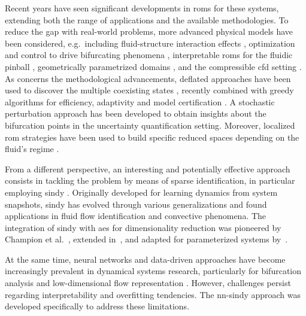 \documentclass[reqno]{amsart}[standalone]
\theoremstyle{definition}
\theoremstyle{remark}
\begin{document}
%

Recent years have seen significant developments in \glspl{rom} for these systems, extending both the range of applications and the available methodologies. To reduce the gap with real-world problems, more advanced physical models have been considered, e.g.\ including fluid-structure interaction effects \parencite{Khamlich_2022}, optimization and control to drive bifurcating phenomena \parencite{PichiDrivingBifurcatingParametrized2022a,Boull2023}, interpretable \glspl{rom} for the fluidic pinball \parencite{Pastur_2019}, geometrically parametrized domains \cite{PICHI2023105813,Bravo_2024}, and the compressible \gls{cfd} setting \parencite{Tonicello_2024}. As concerns the methodological advancements,  deflated approaches have been used to discover the multiple coexisting states \parencite{pintore_2021}, recently combined with greedy algorithms for efficiency, adaptivity and model certification \parencite{pichi2025deflationbasedcertifiedgreedyalgorithm}. A stochastic perturbation approach \parencite{gonnella2025stochasticperturbationapproachnonlinear} has been developed to obtain insights about the bifurcation points in the uncertainty quantification setting. Moreover, localized \gls{rom} strategies have been used to build specific reduced spaces depending on the fluid's regime \parencite{Hess_2019}.

%

From a different perspective, an interesting and potentially effective approach consists in tackling the problem by means of sparse identification, in particular employing \gls{sindy} \parencite{Brunton_2016}. Originally developed for learning dynamics from system snapshots, \gls{sindy} has evolved through various generalizations \parencite{SINDy_ensemble, SINDyCP, Messenger_2021} and found applications in fluid flow identification \parencite{Fukami_Murata_Zhang_Fukagata_2021, wang_zhang_2024} and convective phenomena. The integration of \gls{sindy} with \glspl{ae} for dimensionality reduction was pioneered by Champion et al.~\parencite{Champion_2019}, extended in~\parencite{DEEPDELAY}, and adapted for parameterized systems by~\parencite{Conti_2023}.

At the same time, neural networks and data-driven approaches have become increasingly prevalent in dynamical systems research, particularly for bifurcation analysis \parencite{Kalia2021LearningNF,PICHI2023105813} and low-dimensional flow representation \parencite{Della_Pia_2024, spider}. However, challenges persist regarding interpretability and overfitting tendencies. The \gls{nn}-\gls{sindy} approach was developed specifically to address these limitations.
\end{document}
